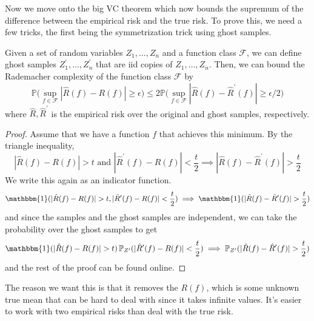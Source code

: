   Now we move onto the big VC theorem which now bounds the supremum of the difference between the empirical risk and the true risk. To prove this, we need a few tricks, the first being the symmetrization trick using ghost samples. 

  \begin{lemma}
    Given a set of random variables $Z_1, \ldots, Z_n$ and a function class $\mathcal{F}$, we can define ghost samples $Z_1^\prime, \ldots, Z_n^\prime$ that are iid copies of $Z_1, \ldots, Z_n$. Then, we can bound the Rademacher complexity of the function class $\mathcal{F}$ by 
    \begin{equation}
      \mathbb{P} \bigg( \sup_{f \in \mathcal{F}} | \hat{R} (f) - R(f) | \geq \epsilon \bigg) \leq 2 \mathbb{P} \bigg( \sup_{f \in \mathcal{F}} | \hat{R} (f) - \hat{R}^\prime (f) | \geq \epsilon / 2 \bigg)
    \end{equation}
    where $\hat{R}, \hat{R}^\prime$ is the empirical risk over the original and ghost samples, respectively. 
  \end{lemma}
  \begin{proof}
    Assume that we have a function $f$ that achieves this minimum. By the triangle inequality, 
    \begin{equation}
      | \hat{R} (f) - R(f)| > t \text{ and } | \hat{R}^\prime (f) - R(f)| < \frac{t}{2} \implies | \hat{R} (f) - \hat{R}^\prime (f) | > \frac{t}{2}
    \end{equation}
    We write this again as an indicator function. 
    \begin{equation}
      \mathbbm{1} (| \hat{R} (f) - R(f)| > t, | \hat{R}^\prime (f) - R(f)| < \frac{t}{2}) \implies \mathbbm{1} (| \hat{R} (f) - \hat{R}^\prime (f) | > \frac{t}{2})
    \end{equation}
    and since the samples and the ghost samples are independent, we can take the probability over the ghost samples to get 
    \begin{equation}
      \mathbbm{1} (| \hat{R} (f) - R(f)| > t) \, \mathbb{P}_{Z^\prime} (| \hat{R}^\prime (f) - R(f)| < \frac{t}{2}) \implies \mathbb{P}_{Z^\prime} (| \hat{R} (f) - \hat{R}^\prime (f) | > \frac{t}{2})
    \end{equation}
    and the rest of the proof can be found online. 
  \end{proof}

  The reason we want this is that it removes the $R(f)$, which is some unknown true mean that can be hard to deal with since it takes infinite values. It's easier to work with two empirical risks than deal with the true risk. 

